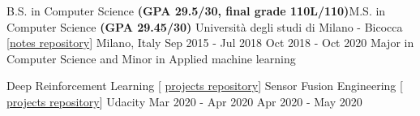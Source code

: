 

\begin{cventries}

  \cventry
  {B.S. in Computer Science \textbf{(GPA 29.5/30, final grade 110L/110)}\linebreak M.S. in Computer Science \textbf{(GPA 29.45/30)}  } %
  {Università degli studi di Milano - Bicocca  {\tiny [\href{https://github.com/gianscarpe/unimib}{notes repository}]} } %
  {Milano, Italy} %
  {Sep 2015 - Jul 2018 \linebreak Oct 2018 - Oct 2020} %
  {Major in Computer Science and Minor in Applied machine learning
  }

  \cventry
  {Deep Reinforcement Learning {\tiny [ \href{https://github.com/gianscarpe/udacity_deep_reinforcement_learning}{projects repository}]} 	
    \linebreak
    Sensor Fusion Engineering {\tiny [ \href{https://github.com/gianscarpe/udacity_sensor_fusion}{projects repository}]}
  } %
  {Udacity} %
  {} %
  {Mar 2020 - Apr 2020 \linebreak Apr 2020 - May 2020} %
  {
  }
  \vspace{-0.7cm}
\end{cventries}
